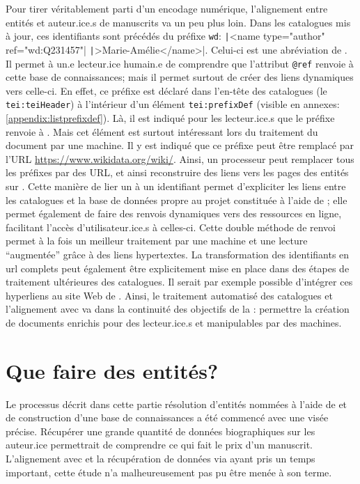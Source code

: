 Pour tirer véritablement parti d'un encodage numérique, l'alignement entre entités \wkd{} et auteur.ice.s de manuscrits va un peu plus loin. Dans les catalogues mis à jour, ces identifiants sont précédés du préfixe \texttt{wd}: \texttt|<name type="author" ref="wd:Q231457"| \texttt|>Marie-Amélie</name>|. Celui-ci est une abréviation de \wkd{}. Il permet à un.e lecteur.ice humain.e de comprendre que l'attribut \texttt{@ref} renvoie à cette base de connaissances; mais il permet surtout de créer des liens dynamiques vers celle-ci. En effet, ce préfixe est déclaré dans l'en-tête des catalogues (le \texttt{tei:teiHeader}) à l'intérieur d'un élément \texttt{tei:prefixDef} (visible en annexes: \ref{appendix:listprefixdef}). Là, il est indiqué pour les lecteur.ice.s que le préfixe renvoie à \wkd{}. Mais cet élément est surtout intéressant lors du traitement du document par une machine. Il y est indiqué que ce préfixe peut être remplacé par l'URL \url{https://www.wikidata.org/wiki/}. Ainsi, un processeur peut remplacer tous les préfixes par des URL, et ainsi reconstruire des liens vers les pages des entités sur \wkd{}. Cette manière de lier un \tname{} à un identifiant \wkd{} permet d'expliciter les liens entre les catalogues et la base de données propre au projet constituée à l'aide de \sparql{}; elle permet également de faire des renvois dynamiques vers des ressources en ligne, facilitant l'accès d'utilisateur.ice.s à celles-ci. Cette double méthode de renvoi permet à la fois un meilleur traitement par une machine et une lecture \enquote{augmentée} grâce à des liens hypertextes. La transformation des identifiants en \gls{url} complets peut également être explicitement mise en place dans des étapes de traitement ultérieures des catalogues. Il serait par exemple possible d'intégrer ces hyperliens au site Web de \ktb{}. Ainsi, le traitement automatisé des catalogues et l'alignement avec \wkd{} va dans la continuité des objectifs de la \tei{}: permettre la création de documents enrichis pour des lecteur.ice.s et manipulables par des machines.

\section{Que faire des entités?}
Le processus décrit dans cette partie résolution d'entités nommées à l'aide de \wkd{} et de construction d'une base de connaissances a été commencé avec une visée précise. Récupérer une grande quantité de données biographiques sur les auteur.ice permettrait de comprendre ce qui fait le prix d'un manuscrit. L'alignement avec \wkd{} et la récupération de données via \sparql{} ayant pris un temps important, cette étude n'a malheureusement pas pu être menée à son terme.

